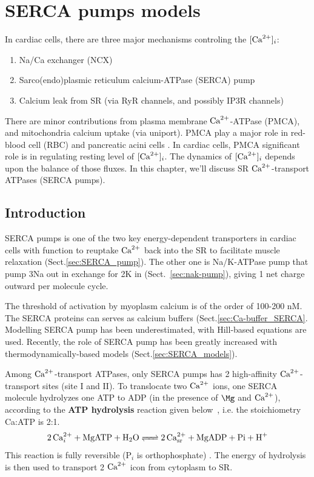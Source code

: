   
\chapter{SERCA pumps models}
\label{chap:serca-pumps-models}

In cardiac cells, there are three major mechanisms controling the $[{\text{Ca}^{2+}}]_i$:
\begin{enumerate}
\item Na/Ca exchanger (NCX)
\item Sarco(endo)plasmic reticulum calcium-ATPase (SERCA) pump
\item Calcium leak from SR (via RyR channels, and possibly IP3R channels)
\end{enumerate}
There are minor contributions from plasma membrane ${\text{Ca}^{2+}}$-ATPase
(PMCA), and mitochondria calcium uptake (via
uniport). PMCA play a major role in red-blood cell (RBC) and pancreatic
acini cells \citep{monteith1995}. In cardiac cells, PMCA significant role is in
regulating resting level of $[{\text{Ca}^{2+}}]_i$. The dynamics of $[{\text{Ca}^{2+}}]_i$ depends upon
the balance of those fluxes. In this chapter, we'll discuss SR ${\text{Ca}^{2+}}$-transport
ATPases (SERCA pumps).

\section{Introduction}
\label{sec:introduction-13}

SERCA pumps is one of the two key energy-dependent transporters in cardiac cells
with function to reuptake ${\text{Ca}^{2+}}$ back into the SR to facilitate muscle
relaxation (Sect.\ref{sec:SERCA_pump}).  The other one is Na/K-ATPase pump that
pump 3Na out in exchange for 2K in (Sect.~\ref{sec:nak-pump}), giving 1 net
charge outward per molecule cycle.

The threshold of activation by myoplasm calcium is of the order of 100-200 nM.
The SERCA proteins can serves as calcium buffers
(Sect.\ref{sec:Ca-buffer_SERCA}. Modelling SERCA pump has been underestimated,
with Hill-based equations are used. Recently, the role of SERCA pump has been
greatly increased with thermodynamically-based models
(Sect.\ref{sec:SERCA_models}).

Among ${\text{Ca}^{2+}}$-transport ATPases, only SERCA pumps has 2 high-affinity
${\text{Ca}^{2+}}$-transport sites (site I and II). To translocate two ${\text{Ca}^{2+}}$ ions, one SERCA
molecule hydrolyzes one ATP to ADP (in the presence of $\Mg$ and ${\text{Ca}^{2+}}$),
according to the {\bf ATP hydrolysis} reaction given below~\citep{Tanford1982a},
i.e. the stoichiometry Ca:ATP is 2:1.
\begin{equation}
  \label{eq:973}
  \ce{2Ca^{2+}_i + MgATP + H2O <=> 2Ca^{2+}_{sr} + MgADP + Pi + H+}
\end{equation}
This reaction is fully reversible (P$_i$ is orthophosphate)
\citep{misquitta1999}. The energy of hydrolysis is then used to transport
2 ${\text{Ca}^{2+}}$ icon from cytoplasm to SR.

